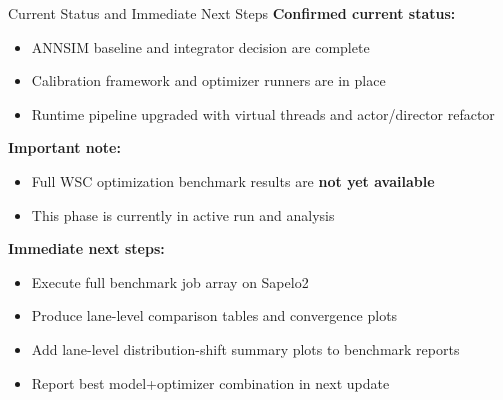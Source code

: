 \documentclass[aspectratio=169]{beamer}
\begin{document}
\begin{frame}{Current Status and Immediate Next Steps}
    \textbf{Confirmed current status:}
    \begin{itemize}
        \item ANNSIM baseline and integrator decision are complete
        \item Calibration framework and optimizer runners are in place
        \item Runtime pipeline upgraded with virtual threads and actor/director refactor
    \end{itemize}

    \vspace{0.7em}
    \textbf{Important note:}
    \begin{itemize}
        \item Full WSC optimization benchmark results are \textbf{not yet available}
        \item This phase is currently in active run and analysis
    \end{itemize}

    \vspace{0.4em}
    \textbf{Immediate next steps:}
    \begin{itemize}
        \item Execute full benchmark job array on Sapelo2
        \item Produce lane-level comparison tables and convergence plots
        \item Add lane-level distribution-shift summary plots to benchmark reports
        \item Report best model+optimizer combination in next update
    \end{itemize}
\end{frame}
\end{document}
